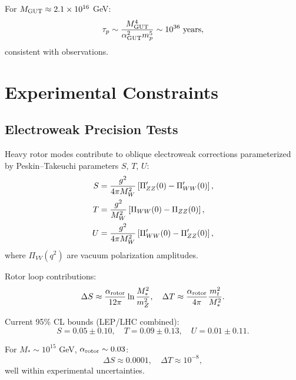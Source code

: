 \documentclass[11pt,a4paper]{article}
\numberwithin{equation}{section}
\theoremstyle{plain}
\theoremstyle{definition}
\theoremstyle{remark}
\begin{document}
For $M_{\rm GUT}\approx 2.1\times 10^{16}$ GeV:
\begin{equation}
\tau_p \sim \frac{M_{\rm GUT}^4}{\alpha_{\rm GUT}^2 m_p^5} \sim 10^{36}\text{ years},
\label{eq:tau-p-prediction}
\end{equation}
consistent with observations.

\vspace{1em}

\section{Experimental Constraints}\label{sec:exp}

\subsection{Electroweak Precision Tests}

Heavy rotor modes contribute to oblique electroweak corrections parameterized by Peskin--Takeuchi parameters $S$, $T$, $U$:
\begin{align}
S &= \frac{g^2}{4\pi M_W^2}\left[\Pi_{ZZ}'(0) - \Pi_{WW}'(0)\right], \notag\\
T &= \frac{g^2}{M_W^2}\left[\Pi_{WW}(0) - \Pi_{ZZ}(0)\right], \notag\\
U &= \frac{g^2}{4\pi M_W^2}\left[\Pi_{WW}'(0) - \Pi_{ZZ}'(0)\right],
\label{eq:STU}
\end{align}
where $\Pi_{VV}(q^2)$ are vacuum polarization amplitudes.

Rotor loop contributions:
\begin{equation}
\Delta S \approx \frac{\alpha_{\rm rotor}}{12\pi}\ln\frac{M_*^2}{m_Z^2}, \quad \Delta T \approx \frac{\alpha_{\rm rotor}}{4\pi}\frac{m_t^2}{M_*^2}.
\label{eq:STU-rotor}
\end{equation}

Current 95\% CL bounds (LEP/LHC combined):
\begin{equation}
S = 0.05\pm 0.10, \quad T = 0.09\pm 0.13, \quad U = 0.01\pm 0.11.
\label{eq:STU-exp}
\end{equation}

For $M_*\sim 10^{15}$ GeV, $\alpha_{\rm rotor}\sim 0.03$:
\begin{equation}
\Delta S \approx 0.0001, \quad \Delta T \approx 10^{-8},
\label{eq:STU-rotor-value}
\end{equation}
well within experimental uncertainties.
\end{document}
